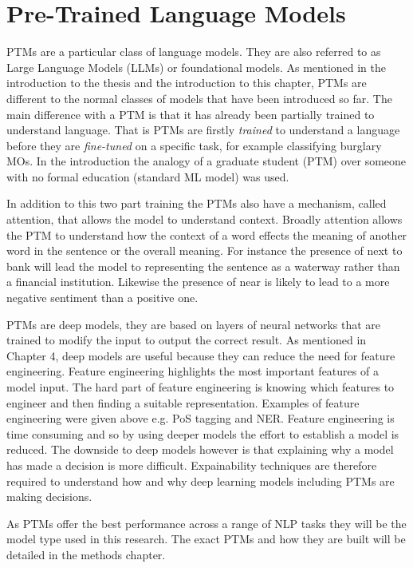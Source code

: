 \section{Pre-Trained Language Models} PTMs are a particular class of language models. They are also referred to as Large Language Models (LLMs) or foundational models. As mentioned in the introduction to the thesis and the introduction to this chapter, PTMs are different to the normal classes of models that have been introduced so far. The main difference with a PTM is that it has already been partially trained to understand language. That is PTMs are firstly \emph{trained} to understand a language before they are \emph{fine-tuned} on a specific task, for example classifying burglary MOs. In the introduction the analogy of a graduate student (PTM) over someone with no formal education (standard ML model) was used. 

In addition to this two part training the PTMs also have a mechanism, called attention, that allows the model to understand context. Broadly attention allows the PTM to understand how the context of a word effects the meaning of another word in the sentence or the overall meaning. For instance the presence of  next to {bank} will lead the model to representing the sentence as a waterway rather than a financial institution. Likewise the presence of  near  is likely to lead to a more negative sentiment than a positive one.

PTMs are deep models, they are based on layers of neural networks that are trained to modify the input to output the correct result. As mentioned in Chapter 4, deep models are useful because they can reduce the need for feature engineering. Feature engineering highlights the most important features of a model input. The hard part of feature engineering is knowing which features to engineer and then finding a suitable representation. Examples of feature engineering were given above e.g. PoS tagging and NER.   Feature engineering is time consuming and so by using deeper models the effort to establish a model is reduced. The downside to deep models however is that explaining why a model has made a decision is more difficult. Expainability techniques are therefore required to understand how and why deep learning models including PTMs are making decisions.

As PTMs offer the best performance across a range of NLP tasks they will be the model type used in this research. The exact PTMs and how they are built will be detailed in the methods chapter. 

